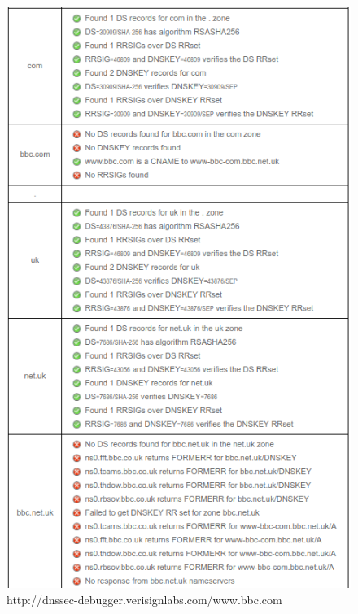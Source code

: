 \documentclass[conference]{IEEEtran}
\begin{document}
\begin{figure}[ht!]
  \includegraphics[width=\linewidth]{DNSSEC.png}
  \caption{http://dnssec-debugger.verisignlabs.com/www.bbc.com}
\end{figure}    



\end{document}
